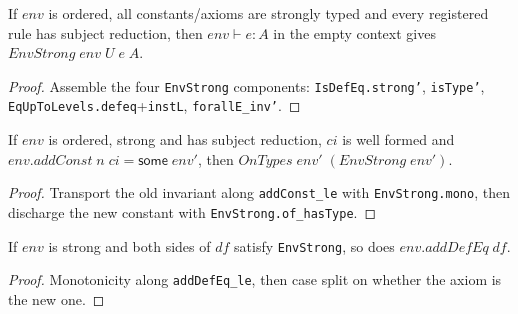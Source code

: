 \begin{theorem}
\label{thm:envstrong-of-hastype}
\leanok
{}

 If $env$ is ordered, all constants/axioms are strongly typed and every
registered rule has subject reduction, then $env\vdash e:A$ in the empty context gives
$EnvStrong\;env\;U\;e\;A$.
\end{theorem}
\begin{proof}
\leanok
{} Assemble the four \texttt{EnvStrong} components: \texttt{IsDefEq.strong'},
\texttt{isType'}, \texttt{EqUpToLevels.defeq}+\texttt{instL}, \texttt{forallE\_inv'}.
\end{proof}

\begin{lemma}
\label{thm:ontypes-addconst}
\leanok
{}

 If $env$ is ordered, strong and has subject reduction, $ci$ is well formed and
$env.addConst\;n\;ci=\mathsf{some}\;env'$, then $OnTypes\;env'\;(EnvStrong\;env')$.
\end{lemma}
\begin{proof}
\leanok
{} Transport the old invariant along \texttt{addConst\_le} with
\texttt{EnvStrong.mono}, then discharge the new constant with \texttt{EnvStrong.of\_hasType}.
\end{proof}

\begin{lemma}
\label{thm:ontypes-adddefeq}
\leanok
{}

 If $env$ is strong and both sides of $df$ satisfy \texttt{EnvStrong}, so does
$env.addDefEq\;df$.
\end{lemma}
\begin{proof}
\leanok
{} Monotonicity along \texttt{addDefEq\_le}, then case split on whether the axiom is
the new one.
\end{proof}

